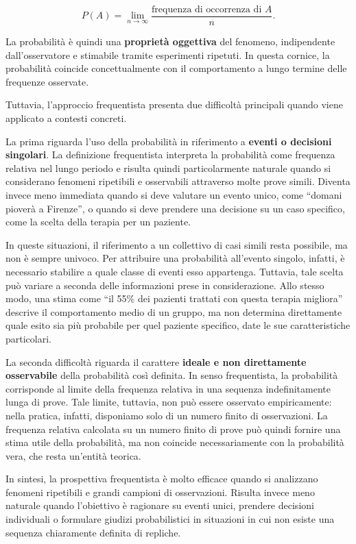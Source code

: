 \documentclass[
  italian,
  letterpaper,
  a4paper,
  11pt,
  open=any]{scrbook}
\theoremstyle{plain}
\theoremstyle{definition}
\theoremstyle{definition}
\theoremstyle{remark}
\begin{document}
\[
P(A) = \lim_{n \to \infty} \frac{\text{frequenza di occorrenza di } A}{n}.
\]

La probabilità è quindi una \textbf{proprietà oggettiva} del fenomeno,
indipendente dall'osservatore e stimabile tramite esperimenti ripetuti.
In questa cornice, la probabilità coincide concettualmente con il
comportamento a lungo termine delle frequenze osservate.

Tuttavia, l'approccio frequentista presenta due difficoltà principali
quando viene applicato a contesti concreti.

La prima riguarda l'uso della probabilità in riferimento a
\textbf{eventi o decisioni singolari}. La definizione frequentista
interpreta la probabilità come frequenza relativa nel lungo periodo e
risulta quindi particolarmente naturale quando si considerano fenomeni
ripetibili e osservabili attraverso molte prove simili. Diventa invece
meno immediata quando si deve valutare un evento unico, come ``domani
pioverà a Firenze'', o quando si deve prendere una decisione su un caso
specifico, come la scelta della terapia per un paziente.

In queste situazioni, il riferimento a un collettivo di casi simili
resta possibile, ma non è sempre univoco. Per attribuire una probabilità
all'evento singolo, infatti, è necessario stabilire a quale classe di
eventi esso appartenga. Tuttavia, tale scelta può variare a seconda
delle informazioni prese in considerazione. Allo stesso modo, una stima
come ``il 55\% dei pazienti trattati con questa terapia migliora''
descrive il comportamento medio di un gruppo, ma non determina
direttamente quale esito sia più probabile per quel paziente specifico,
date le sue caratteristiche particolari.

La seconda difficoltà riguarda il carattere \textbf{ideale e non
direttamente osservabile} della probabilità così definita. In senso
frequentista, la probabilità corrisponde al limite della frequenza
relativa in una sequenza indefinitamente lunga di prove. Tale limite,
tuttavia, non può essere osservato empiricamente: nella pratica,
infatti, disponiamo solo di un numero finito di osservazioni. La
frequenza relativa calcolata su un numero finito di prove può quindi
fornire una stima utile della probabilità, ma non coincide
necessariamente con la probabilità vera, che resta un'entità teorica.

In sintesi, la prospettiva frequentista è molto efficace quando si
analizzano fenomeni ripetibili e grandi campioni di osservazioni.
Risulta invece meno naturale quando l'obiettivo è ragionare su eventi
unici, prendere decisioni individuali o formulare giudizi probabilistici
in situazioni in cui non esiste una sequenza chiaramente definita di
repliche.
\end{document}
